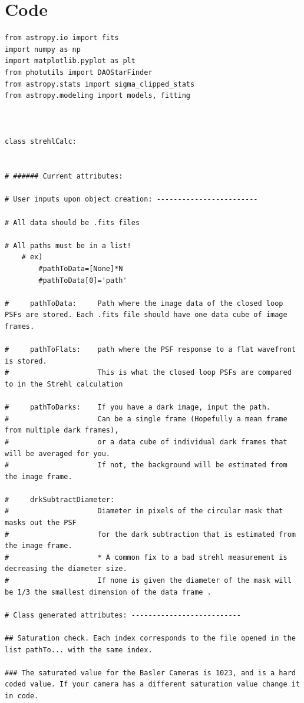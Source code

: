\newpage

\section{Code}
\begin{lstlisting}
from astropy.io import fits
import numpy as np
import matplotlib.pyplot as plt
from photutils import DAOStarFinder
from astropy.stats import sigma_clipped_stats
from astropy.modeling import models, fitting



class strehlCalc:   

        
# ###### Current attributes:

# User inputs upon object creation: ------------------------

# All data should be .fits files
    
# All paths must be in a list!
    # ex) 
        #pathToData=[None]*N
        #pathToData[0]='path'
    
#     pathToData:     Path where the image data of the closed loop PSFs are stored. Each .fits file should have one data cube of image frames.

#     pathToFlats:    path where the PSF response to a flat wavefront is stored.                      
#                     This is what the closed loop PSFs are compared to in the Strehl calculation

#     pathToDarks:    If you have a dark image, input the path.
#                     Can be a single frame (Hopefully a mean frame from multiple dark frames), 
#                     or a data cube of individual dark frames that will be averaged for you.
#                     If not, the background will be estimated from the image frame.

#     drkSubtractDiameter:     
#                     Diameter in pixels of the circular mask that masks out the PSF 
#                     for the dark subtraction that is estimated from the image frame. 
#                     * A common fix to a bad strehl measurement is decreasing the diameter size. 
#                     If none is given the diameter of the mask will be 1/3 the smallest dimension of the data frame . 

# Class generated attributes: --------------------------

## Saturation check. Each index corresponds to the file opened in the list pathTo... with the same index.

### The saturated value for the Basler Cameras is 1023, and is a hard coded value. If your camera has a different saturation value change it in code. 


\end{lstlisting}
